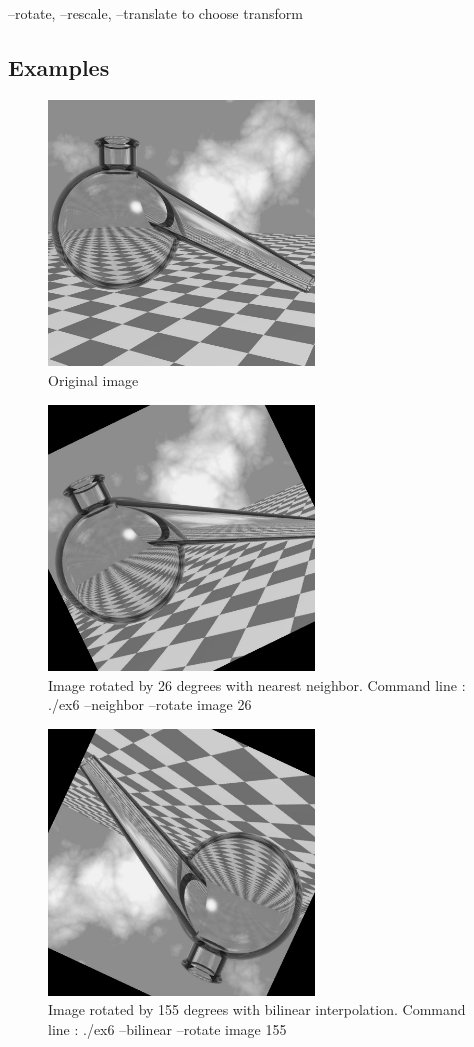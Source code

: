 \documentclass[10pt]{article}
\begin{document}
--rotate, --rescale, --translate to choose transform
\subsection{Examples}
\begin{figure}[!ht]
	\centering
	\includegraphics[height=200pt]{./ex6/ray_trace_bottle.jpg}
	\caption{Original image}
\end{figure}
\begin{figure}[!ht]
	\centering
	\includegraphics[height=200pt]{./ex6/rotate26n.jpg}
	\caption{Image rotated by 26 degrees with nearest neighbor. Command line : ./ex6 --neighbor --rotate image 26}
\end{figure}
\begin{figure}[!ht]
	\centering
	\includegraphics[height=200pt]{./ex6/rotate155b.jpg}
	\caption{Image rotated by 155 degrees with bilinear interpolation. Command line : ./ex6 --bilinear --rotate image 155}
\end{figure}
\end{document}
